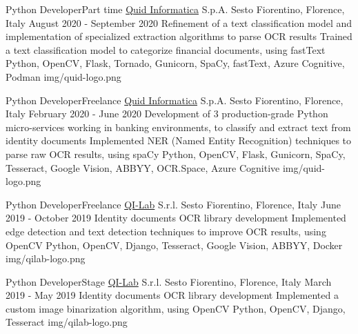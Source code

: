 
\begin{cventries}

  \logocventry
    {Python Developer{\enskip\cdotp\enskip}Part time}
    {\href{https://www.quidinfo.it/}{Quid Informatica} S.p.A.}
    {Sesto Fiorentino, Florence, Italy}
    {August 2020 - September 2020}
    {
      \cvexp
        {Refinement of a text classification model and implementation of specialized extraction algorithms to parse OCR results}
        {Trained a text classification model to categorize financial documents, using fastText}
        {Python, OpenCV, Flask, Tornado, Gunicorn, SpaCy, fastText, Azure Cognitive, Podman}
    }
    {img/quid-logo.png}

  \logocventry
    {Python Developer{\enskip\cdotp\enskip}Freelance}
    {\href{https://www.quidinfo.it/}{Quid Informatica} S.p.A.}
    {Sesto Fiorentino, Florence, Italy}
    {February 2020 - June 2020}
    {
      \cvexp
        {Development of 3 production-grade Python micro-services working in banking environments, to classify and extract text from identity documents}
        {Implemented NER (Named Entity Recognition) techniques to parse raw OCR results, using spaCy}
        {Python, OpenCV, Flask, Gunicorn, SpaCy, Tesseract, Google Vision, ABBYY, OCR.Space, Azure Cognitive}
    }
    {img/quid-logo.png}

  \logocventry
    {Python Developer{\enskip\cdotp\enskip}Freelance}
    {\href{https://www.qi-lab.it/}{QI-Lab} S.r.l.}
    {Sesto Fiorentino, Florence, Italy}
    {June 2019 - October 2019}
    {
      \cvexp
        {Identity documents OCR library development}
        {Implemented edge detection and text detection techniques to improve OCR results, using OpenCV}
        {Python, OpenCV, Django, Tesseract, Google Vision, ABBYY, Docker}
    }
    {img/qilab-logo.png}
  
  \logocventry
    {Python Developer{\enskip\cdotp\enskip}Stage}
    {\href{https://www.qi-lab.it/}{QI-Lab} S.r.l.}
    {Sesto Fiorentino, Florence, Italy}
    {March 2019 - May 2019}
    {
      \cvexp
        {Identity documents OCR library development}
        {Implemented a custom image binarization algorithm, using OpenCV}
        {Python, OpenCV, Django, Tesseract}
    }
    {img/qilab-logo.png}


\end{cventries}
